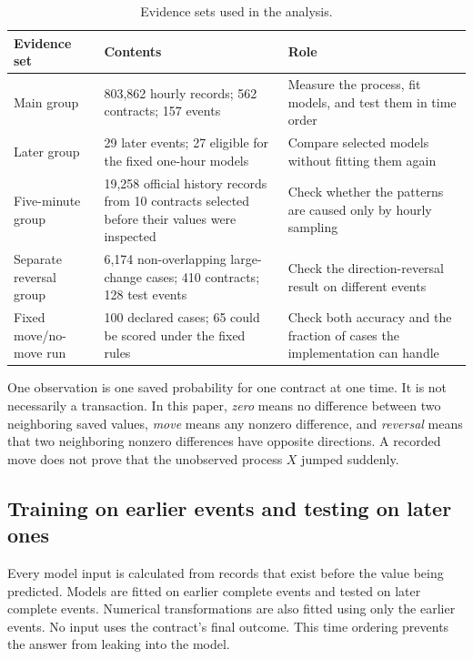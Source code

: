 \documentclass[10pt,twoside]{article}
\begin{document}
\begin{table}[htbp]
\centering
\caption{Evidence sets used in the analysis.}
\label{tab:evidence}
\small
\begin{tabularx}{\textwidth}{@{}p{}Y Y@{}}
\toprule
Evidence set & Contents & Role \\
\midrule
Main group & 803,862 hourly records; 562 contracts; 157 events & Measure the process, fit models, and test them in time order \\
Later group & 29 later events; 27 eligible for the fixed one-hour models & Compare selected models without fitting them again \\
Five-minute group & 19,258 official history records from 10 contracts selected before their values were inspected & Check whether the patterns are caused only by hourly sampling \\
Separate reversal group & 6,174 non-overlapping large-change cases; 410 contracts; 128 test events & Check the direction-reversal result on different events \\
Fixed move/no-move run & 100 declared cases; 65 could be scored under the fixed rules & Check both accuracy and the fraction of cases the implementation can handle \\
\bottomrule
\end{tabularx}
\end{table}

One observation is one saved probability for one contract at one time. It is not necessarily a transaction. In this paper, \emph{zero} means no difference between two neighboring saved values, \emph{move} means any nonzero difference, and \emph{reversal} means that two neighboring nonzero differences have opposite directions. A recorded move does not prove that the unobserved process $X$ jumped suddenly.

\subsection{Training on earlier events and testing on later ones}

Every model input is calculated from records that exist before the value being predicted. Models are fitted on earlier complete events and tested on later complete events. Numerical transformations are also fitted using only the earlier events. No input uses the contract's final outcome. This time ordering prevents the answer from leaking into the model.
\end{document}
